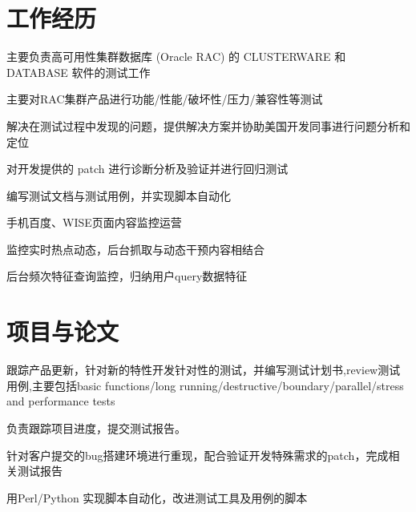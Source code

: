 \documentclass[]{deedy-resume-openfont}
\begin{document}
\hfill
\begin{minipage}[t]{0.73\textwidth} 


\section{工作经历}
\sectionsep
{}
\vspace{\topsep}
\begin{tightemize}
    \item 主要负责高可⽤性集群数据库 (Oracle RAC) 的 CLUSTERWARE 和 DATABASE 软件的测试工作
    \item 主要对RAC集群产品进行功能/性能/破坏性/压力/兼容性等测试
    \item 解决在测试过程中发现的问题，提供解决⽅案并协助美国开发同事进行问题分析和定位
    \item 对开发提供的 patch 进⾏诊断分析及验证并进⾏回归测试
    \item 编写测试文档与测试用例，并实现脚本自动化
\end{tightemize}
\sectionsep

\begin{tightemize}
\item ⼿机百度、WISE⻚面内容监控运营
\item 监控实时热点动态，后台抓取与动态⼲预内容相结合
\item 后台频次特征查询监控，归纳用户query数据特征
\end{tightemize}
\sectionsep


\section{项目与论文}
\sectionsep
{}
\begin{tightemize}
    \item 跟踪产品更新，针对新的特性开发针对性的测试，并编写测试计划书,review测试⽤例,主要包括basic functions/long running/destructive/boundary/parallel/stress and performance tests
    \item 负责跟踪项⽬进度，提交测试报告。
    \item 针对客户提交的bug搭建环境进⾏重现，配合验证开发特殊需求的patch，完成相关测试报告
    \item ⽤Perl/Python 实现脚本⾃动化，改进测试⼯具及用例的脚本
    \end{tightemize}
\sectionsep


\end{minipage}
\end{document}
